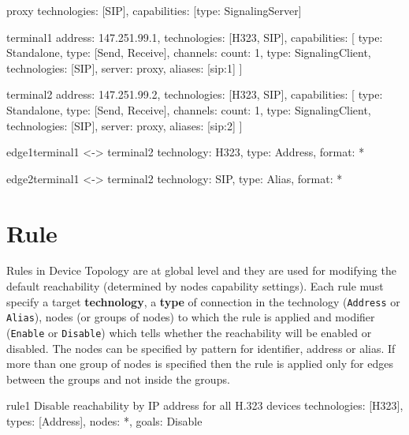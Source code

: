 \begin{ResourceExample}{}{proxy}{}
technologies: [SIP],
capabilities: [{type: SignalingServer}]
\end{ResourceExample}

\begin{ResourceExample}{}{terminal1}{}
address: 147.251.99.1,
technologies: [H323, SIP],
capabilities: [
  {type: Standalone},
  {type: [Send, Receive], channels: {count: 1}}, 
  {type: SignalingClient, technologies: [SIP], server: proxy, aliases: [sip:1]}
]
\end{ResourceExample}

\begin{ResourceExample}{}{terminal2}{}
address: 147.251.99.2,
technologies: [H323, SIP],
capabilities: [
  {type: Standalone},
  {type: [Send, Receive], channels: {count: 1}}, 
  {type: SignalingClient, technologies: [SIP], server: proxy, aliases: [sip:2]}
]
\end{ResourceExample}

\begin{ResourceExample}{}{edge1}{terminal1 <-> terminal2}
technology: H323,
type: Address,
format: *
\end{ResourceExample}

\begin{ResourceExample}{}{edge2}{terminal1 <-> terminal2}
technology: SIP,
type: Alias,
format: *
\end{ResourceExample} 
  
  
\section{Rule}
Rules in Device Topology are at global level and they are used for modifying 
the default reachability (determined by nodes capability settings). Each rule 
must specify a target \textbf{technology}, a \textbf{type} of connection in 
the technology (\verb|Address| or \verb|Alias|), nodes (or groups of nodes) 
to which the rule is applied and modifier (\verb|Enable| or \verb|Disable|) 
which tells whether the reachability will be enabled or disabled. The nodes 
can be specified by pattern for identifier, address or alias. If more than 
one group of nodes is specified then the rule is applied only for edges 
between the groups and not inside the groups.

\begin{ResourceExample}{}{rule1}%
      {Disable reachability by IP address for all H.323 devices}
technologies: [H323],
types: [Address],
nodes: *,
goals: Disable
\end{ResourceExample}

